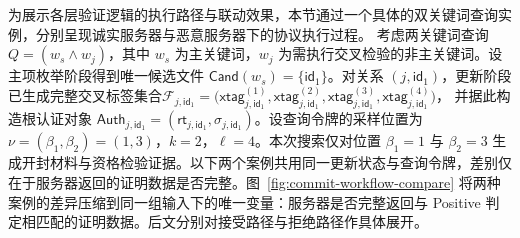 为展示各层验证逻辑的执行路径与联动效果，本节通过一个具体的双关键词查询实例，分别呈现诚实服务器与恶意服务器下的协议执行过程。
考虑两关键词查询 $Q=(w_s\wedge w_j)$，其中 $w_s$ 为主关键词，$w_j$ 为需执行交叉检验的非主关键词。设主项枚举阶段得到唯一候选文件 $\mathsf{Cand}(w_s)=\{\mathsf{id}_1\}$。对关系 $(j,\mathsf{id}_1)$，更新阶段已生成完整交叉标签集合$\mathcal{F}_{j,\mathsf{id}_1}=\bigl(\mathsf{xtag}_{j,\mathsf{id}_1}^{(1)},\mathsf{xtag}_{j,\mathsf{id}_1}^{(2)},\mathsf{xtag}_{j,\mathsf{id}_1}^{(3)},\mathsf{xtag}_{j,\mathsf{id}_1}^{(4)}\bigr)$，
并据此构造根认证对象 $\mathsf{Auth}_{j,\mathsf{id}_1}=(\mathsf{rt}_{j,\mathsf{id}_1},\sigma_{j,\mathsf{id}_1})$。设查询令牌的采样位置为 $\nu=(\beta_1,\beta_2)=(1,3)$，$k=2$，$\ell=4$。本次搜索仅对位置 $\beta_1=1$ 与 $\beta_2=3$ 生成开封材料与资格检验证据。以下两个案例共用同一更新状态与查询令牌，差别仅在于服务器返回的证明数据是否完整。图~\ref{fig:commit-workflow-compare} 将两种案例的差异压缩到同一组输入下的唯一变量：服务器是否完整返回与 Positive 判定相匹配的证明数据。后文分别对接受路径与拒绝路径作具体展开。

